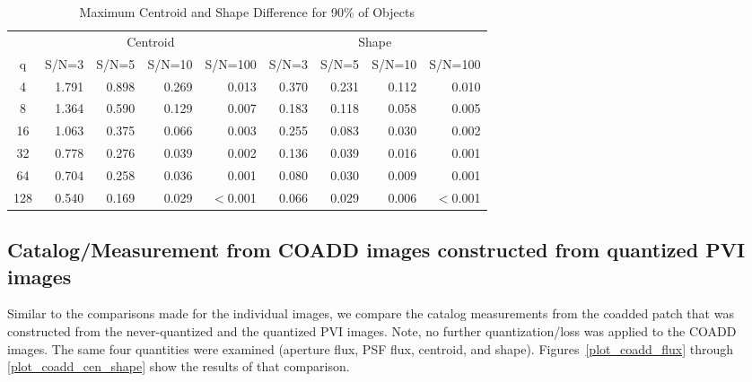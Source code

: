 \begin{table}
\caption{Maximum Centroid and Shape Difference for 90\% of Objects}
\centering
\begin{tabular}[]{c|rrrr|rrrr}
\hline
     &  \multicolumn{4}{c}{Centroid}  & \multicolumn{4}{c}{Shape} \\
 q   &  S/N=3 & S/N=5 & S/N=10 & S/N=100 & S/N=3 & S/N=5 & S/N=10 & S/N=100  \\
\hline
   4 & 1.791 & 0.898 & 0.269  & 0.013 &  0.370 & 0.231 & 0.112  & 0.010 \\
   8 & 1.364 & 0.590 & 0.129  & 0.007 &  0.183 & 0.118 & 0.058  & 0.005 \\
  16 & 1.063 & 0.375 & 0.066  & 0.003 &  0.255 & 0.083 & 0.030  & 0.002 \\
  32 & 0.778 & 0.276 & 0.039  & 0.002 &  0.136 & 0.039 & 0.016  & 0.001 \\
  64 & 0.704 & 0.258 & 0.036  & 0.001 &  0.080 & 0.030 & 0.009  & 0.001 \\
 128 & 0.540 & 0.169 & 0.029  & $<$0.001 &  0.066 & 0.029 & 0.006  & $<$0.001 \\
\hline
\end{tabular}
\label{tab_se_cen_shape_diff}
\end{table}



\clearpage

\subsection{Catalog/Measurement from COADD images constructed from quantized PVI images}

Similar to the comparisons made for the individual images, we compare the catalog measurements from the coadded patch
that was constructed from the never-quantized and the quantized PVI images.  Note, no further quantization/loss was applied
to the COADD images.  The same four quantities were examined (aperture flux, PSF flux, centroid, and shape).  
Figures~\ref{plot_coadd_flux} through \ref{plot_coadd_cen_shape} show the results of that comparison.


